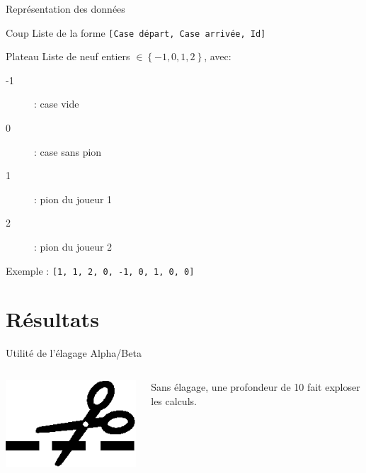 \documentclass[compress, 12pt]{beamer}
\begin{document}
\begin{frame}{Représentation des données}
    \begin{block}{Coup}
          Liste de la forme \texttt{[Case départ, Case arrivée, Id]}
    \end{block}
    \begin{block}{Plateau}
        Liste de neuf entiers $\in \left\{-1, 0, 1, 2\right\}$, avec:
        \begin{description}
	        \item [-1] : case vide
	        \item [0] : case sans pion
	        \item [1] : pion du joueur 1
	        \item [2] : pion du joueur 2
        \end{description}
        Exemple : \texttt{[1, 1, 2, 0, -1, 0, 1, 0, 0]}
    \end{block}
\end{frame}

\section{Résultats}

\begin{frame}{Utilité de l'élagage Alpha/Beta}
    \begin{columns}
        \begin{column}{.2\textwidth}
            \includegraphics[width=1.3\textwidth]{./pix/sym_cut}
        \end{column}
        \begin{column}{.6\textwidth}
            \begin{center}
                Sans élagage, une profondeur de 10 fait exploser les calculs.
            \end{center}
        \end{column}
    \end{columns}
\end{frame}
\end{document}
